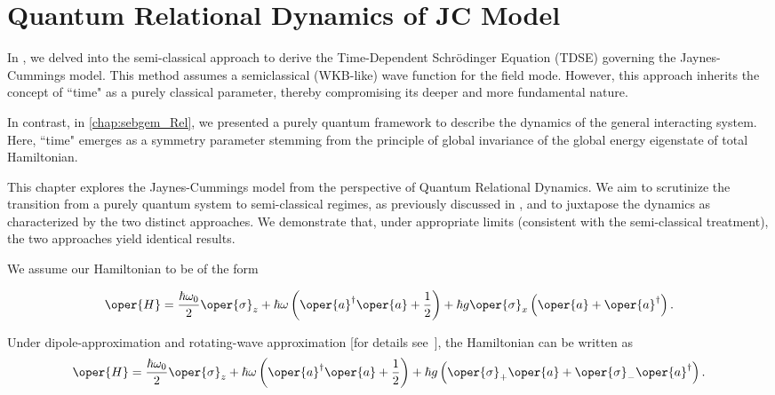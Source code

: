 \chapter{Quantum Relational Dynamics of JC Model
\label{chap5:RDQ_JCM_chap}}

In , we delved into the semi-classical approach to derive the Time-Dependent Schrödinger Equation (TDSE) governing the Jaynes-Cummings model. 
This method assumes a semiclassical (WKB-like) wave function for the field mode. However, 
this approach inherits the concept of ``time" as a purely classical parameter, thereby compromising its deeper and more fundamental nature.

In contrast, in \ref{chap:sebgem_Rel}, we presented a purely quantum framework to describe the dynamics of the general interacting system. Here, ``time" 
emerges as a symmetry parameter stemming from the principle of global invariance of the global energy 
eigenstate of total Hamiltonian.

This chapter explores the Jaynes-Cummings model from the perspective of Quantum Relational Dynamics. 
We aim to scrutinize the transition from a purely quantum system to semi-classical regimes, 
as previously discussed in , and to juxtapose the dynamics as 
characterized by the two distinct approaches. We demonstrate that, under appropriate limits
(consistent with the semi-classical treatment), the two approaches yield identical results. 

We assume our Hamiltonian to be of the form

\begin{eqnarray}
        \label{eq:chap5_JCM_Hamiltonian}
        \oper{H} = \frac{\hbar \omega_0}{2} \oper{\sigma}_z + \hbar \omega \left(\oper{a}^\dagger \oper{a} + \frac{1}{2}\right) 
        + \hbar g \oper{\sigma}_x\left(\oper{a} + \oper{a}^\dagger\right). 
\end{eqnarray}


Under dipole-approximation and rotating-wave approximation 
[for details see~], the Hamiltonian can be written as
\begin{equation}
        \label{eq:chap5_JCM_Hamiltonian_RWA}
        \oper{H} = \frac{\hbar \omega_0}{2} \oper{\sigma}_z + \hbar \omega \left(\oper{a}^\dagger \oper{a} + \frac{1}{2}\right) 
        + \hbar g \left(\oper{\sigma}_+ \oper{a} + \oper{\sigma}_- \oper{a}^\dagger\right).
\end{equation}

